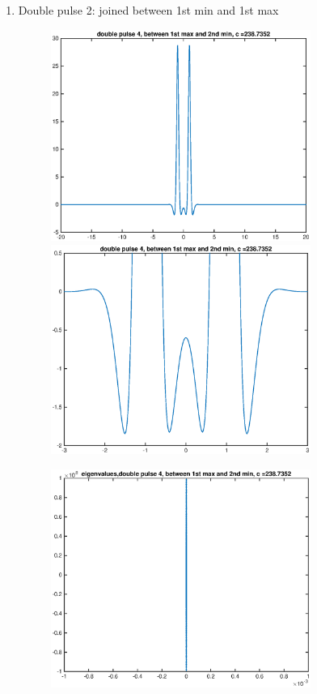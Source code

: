 \documentclass[12pt]{article}
\begin{document}
\begin{enumerate}
	\item Double pulse 2: joined between 1st min and 1st max
	\begin{figure}[H]
	\includegraphics[width=8.5cm]{1double2.eps}
	\includegraphics[width=8.5cm]{1double2zoom.eps}
	\end{figure}
	\begin{figure}[H]
	\includegraphics[width=8.5cm]{1double2eig.eps}
	\end{figure}


\end{enumerate}
\end{document}
